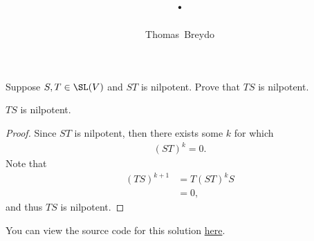 \documentclass{amsart}
\title{\pagenum.\probnum}
\author{Thomas\ Breydo}
\newcommand{\pagenum}{250}
\newcommand{\probnum}{9}
\begin{document}
\maketitle

\begin{problem*}
Suppose $S,T\in\SL(V)$ and $ST$ is nilpotent. Prove that $TS$ is
nilpotent.
\end{problem*}

\vspace{0.5in}

\begin{claim*}
$TS$ is nilpotent.
\end{claim*}
\begin{proof}
Since $ST$ is nilpotent, then there exists some $k$ for which
\begin{align*}
    (ST)^{k} = 0.
\end{align*}
Note that
\begin{align*}
    (TS)^{k+1} &= T(ST)^kS \\
               &= 0,
\end{align*}
and thus $TS$ is nilpotent.
\end{proof}

\vspace{0.5in}

\begin{note*}
You can view the source code for this solution
\href{https://github.com/thomasbreydo/linalg/blob/main/\pagenum_\probnum_Thomas_Breydo.tex}
{here}.
\end{note*}
\end{document}
